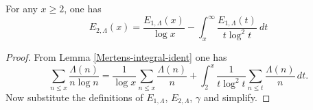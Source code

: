 \begin{corollary}
\label{Mertens-second-error-mangoldt-eq}
\leanok
For any $x \geq 2$, one has
$$ E_{2,\Lambda}(x) = \frac{E_{1,\Lambda}(x)}{\log x} - \int_x^\infty \frac{E_{1,\Lambda}(t)}{t \log^2 t}\ dt$$
\end{corollary}
\begin{proof}
\leanok
From Lemma \ref{Mertens-integral-ident} one has
$$ \sum_{n \leq x} \frac{\Lambda(n)}{n \log n} = \frac{1}{\log x} \sum_{n \leq x} \frac{\Lambda(n)}{n} + \int_2^x \frac{1}{t \log^2 t} \sum_{n \leq t} \frac{\Lambda(n)}{n} \, dt.$$
Now substitute the definitions of $E_{1,\Lambda}$, $E_{2,\Lambda}$, $\gamma$ and simplify.
\end{proof}
